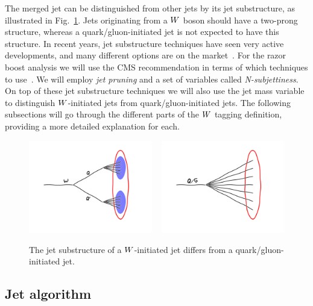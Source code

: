 The merged jet can be distinguished from other jets by its jet substructure, as illustrated in
Fig.~\ref{fig:boost_wtag_cartoon}. Jets originating from a $W$ boson should have a two-prong
structure, whereas a quark/gluon-initiated jet is not expected to have this structure. 
In recent years, jet substructure techniques have seen very active developments, and many different
options are on the market~\cite{}. For the razor boost analysis we will use the CMS recommendation
in terms of which techniques to use~\cite{CMS-PAS-JME-13-006,Khachatryan:2014vla}. We will employ
\textit{jet pruning} and a set of variables called \textit{N-subjettiness}. On top of these jet
substructure techniques we will also use the jet mass variable to distinguish $W$-initiated jets
from quark/gluon-initiated jets. 
The following subsections will go through the different parts of the
$W$ tagging definition, providing a more detailed explanation for each. 

\begin{figure}
  \centering
  \includegraphics[width=0.48\textwidth]{figures/razor_wtag/W_subjets}
  ~
  \includegraphics[width=0.48\textwidth]{figures/razor_wtag/qg_jets}
  \caption{The jet substructure of a $W$-initiated jet differs from a quark/gluon-initiated jet.
  \label{fig:boost_wtag_cartoon}}
\end{figure}


\subsection{Jet algorithm}

